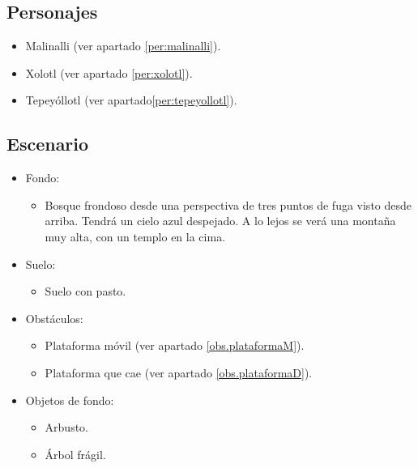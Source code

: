 	\subsection{Personajes}
\begin{itemize}
	\item Malinalli (ver apartado \ref{per:malinalli}).
	\item Xolotl (ver apartado \ref{per:xolotl}).
		
	\item Tepeyóllotl (ver apartado\ref{per:tepeyollotl}).
\end{itemize}
\subsection{Escenario}
\begin{itemize} 
	\item Fondo:
\begin{itemize}
	\item Bosque frondoso desde una perspectiva de tres puntos de fuga visto desde arriba. Tendrá un cielo azul despejado. A lo lejos se verá una montaña muy alta, con un templo en la cima.
\end{itemize}
	\item Suelo:
		\begin{itemize}
			\item Suelo con pasto.
		\end{itemize}
	\item Obstáculos:
		\begin{itemize}
			\item Plataforma móvil (ver apartado \ref{obs.plataformaM}).
			\item Plataforma que cae (ver apartado \ref{obs.plataformaD}).
		\end{itemize}
	\item Objetos de fondo:
		\begin{itemize}
			\item Arbusto.
			\item Árbol frágil.
		\end{itemize}
\end{itemize}	
